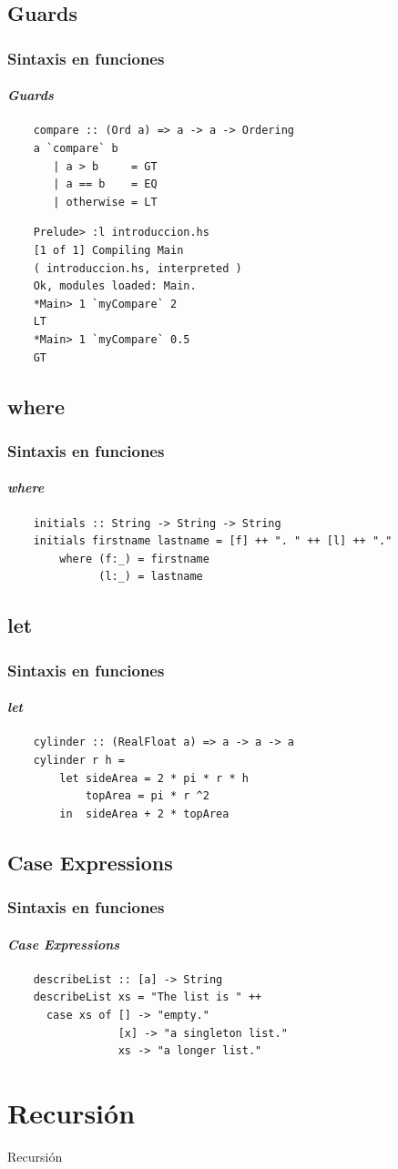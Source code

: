 \documentclass{beamer}
\begin{document}
\subsection{Guards}
\begin{frame}[fragile]
  \frametitle{Sintaxis en funciones}
  \framesubtitle{\emph{Guards}}
  \begin{verbatim}
    compare :: (Ord a) => a -> a -> Ordering
    a `compare` b
       | a > b     = GT
       | a == b    = EQ
       | otherwise = LT
  \end{verbatim}
  \begin{verbatim}
    Prelude> :l introduccion.hs
    [1 of 1] Compiling Main
    ( introduccion.hs, interpreted )
    Ok, modules loaded: Main.
    *Main> 1 `myCompare` 2
    LT
    *Main> 1 `myCompare` 0.5
    GT
  \end{verbatim}
\end{frame}

\subsection{where}
\begin{frame}[fragile]
  \frametitle{Sintaxis en funciones}
  \framesubtitle{\emph{where}}
  \begin{verbatim}
    initials :: String -> String -> String  
    initials firstname lastname = [f] ++ ". " ++ [l] ++ "."  
        where (f:_) = firstname  
              (l:_) = lastname    
  \end{verbatim}
\end{frame}
\subsection{let}
\begin{frame}[fragile]
  \frametitle{Sintaxis en funciones}
  \framesubtitle{\emph{let}}
  \begin{verbatim}
    cylinder :: (RealFloat a) => a -> a -> a  
    cylinder r h = 
        let sideArea = 2 * pi * r * h  
            topArea = pi * r ^2  
        in  sideArea + 2 * topArea  
  \end{verbatim}
\end{frame}
\subsection{Case Expressions}
\begin{frame}[fragile]
  \frametitle{Sintaxis en funciones}
  \framesubtitle{\emph{Case Expressions}}
  \begin{verbatim}
    describeList :: [a] -> String  
    describeList xs = "The list is " ++
      case xs of [] -> "empty."  
                 [x] -> "a singleton list."   
                 xs -> "a longer list."  
  \end{verbatim}
\end{frame}
\section{Recursión}
\begin{frame}{Recursión}      %

\end{frame}
\end{document}
